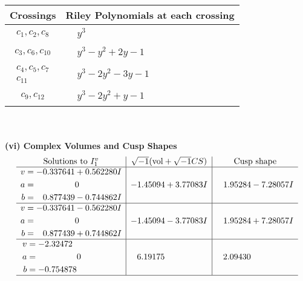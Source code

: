 \documentclass[1p]{elsarticle_modified}
\theoremstyle{definition}
\newcommand{\I}{\sqrt{-1}}
\begin{document}
\begin{tabular}{m{50pt}|m{274pt}}
Crossings & \hspace{64pt}Riley Polynomials at each crossing \\
\hline $$\begin{aligned}c_{1},c_{2},c_{8}\end{aligned}$$&$\begin{aligned}
&y^3
\end{aligned}$\\
\hline $$\begin{aligned}c_{3},c_{6},c_{10}\end{aligned}$$&$\begin{aligned}
&y^3- y^2+2 y-1
\end{aligned}$\\
\hline $$\begin{aligned}c_{4},c_{5},c_{7}\\c_{11}\end{aligned}$$&$\begin{aligned}
&y^3-2 y^2-3 y-1
\end{aligned}$\\
\hline $$\begin{aligned}c_{9},c_{12}\end{aligned}$$&$\begin{aligned}
&y^3-2 y^2+y-1
\end{aligned}$\\
\hline
\end{tabular}\\~\\
\newpage\flushleft \textbf{(vi) Complex Volumes and Cusp Shapes}
$$\begin{array}{c|c|c}  
\text{Solutions to }I^v_{1}& \I (\text{vol} + \sqrt{-1}CS) & \text{Cusp shape}\\
 \hline 
\begin{aligned}
v &= -0.337641 + 0.562280 I \\
a &= \phantom{-0.000000 } 0 \\
b &= \phantom{-}0.877439 - 0.744862 I\end{aligned}
 & -1.45094 + 3.77083 I & \phantom{-}1.95284 - 7.28057 I \\ \hline\begin{aligned}
v &= -0.337641 - 0.562280 I \\
a &= \phantom{-0.000000 } 0 \\
b &= \phantom{-}0.877439 + 0.744862 I\end{aligned}
 & -1.45094 - 3.77083 I & \phantom{-}1.95284 + 7.28057 I \\ \hline\begin{aligned}
v &= -2.32472\phantom{ +0.000000I} \\
a &= \phantom{-0.000000 } 0 \\
b &= -0.754878\phantom{ +0.000000I}\end{aligned}
 & \phantom{-}6.19175\phantom{ +0.000000I} & \phantom{-}2.09430\phantom{ +0.000000I}\\
 \hline 
 \end{array}$$\newpage
\end{document}
